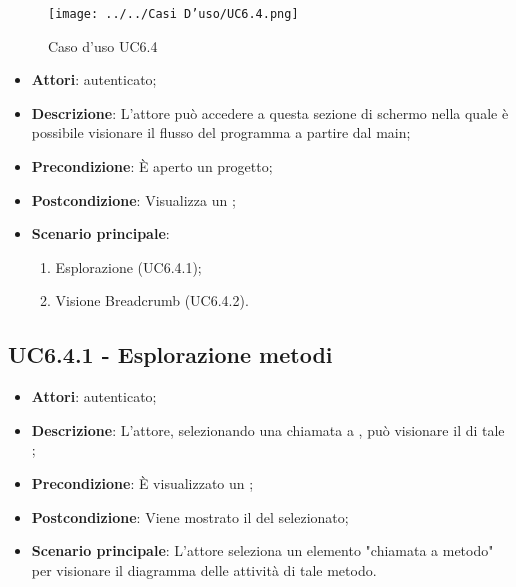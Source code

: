 \begin{figure}[h!]
\centering
\texttt{[image: ../../Casi D'uso/UC6.4.png]}
\caption{Caso d'uso UC6.4}
 \end{figure}
\begin{itemize}
\item \textbf{Attori}:  autenticato;
\item \textbf{Descrizione}: L'attore può accedere a questa sezione di schermo nella quale è possibile visionare il flusso del programma a partire dal  main;
\item \textbf{Precondizione}: È aperto un progetto;
\item \textbf{Postcondizione}: Visualizza un ;
\item \textbf{Scenario principale}: \begin{enumerate}\item Esplorazione  (UC6.4.1);\item Visione Breadcrumb (UC6.4.2).
 \end{enumerate}
\end{itemize}
\subsection{UC6.4.1 - Esplorazione metodi}
\label{ssec:UC6.4.1}
\begin{itemize}
\item \textbf{Attori}:  autenticato;
\item \textbf{Descrizione}: L'attore, selezionando una chiamata a , può visionare il  di tale ;
\item \textbf{Precondizione}: È visualizzato un ;
\item \textbf{Postcondizione}: Viene mostrato il  del  selezionato;
\item \textbf{Scenario principale}: L'attore seleziona un elemento "chiamata a metodo" per visionare il diagramma delle attività di tale metodo.
\end{itemize}
